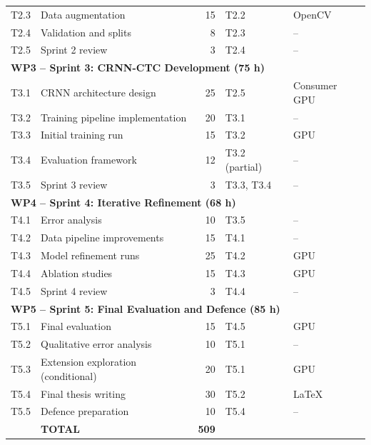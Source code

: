 \documentclass[11pt, a4paper]{article}
\begin{document}
\begin{table}[h!]
\begin{tabularx}{\linewidth}{c >{\raggedright}p{4.2cm} r >{\raggedright\arraybackslash}p{2.2cm} >{\raggedright\arraybackslash}p{2.0cm}}
        T2.3 & Data augmentation                    & 15  & T2.2           & OpenCV \\
        T2.4 & Validation and splits                & 8   & T2.3           & -- \\
        T2.5 & Sprint 2 review                      & 3   & T2.4           & -- \\
        \midrule
        \multicolumn{5}{l}{\textbf{WP3 -- Sprint 3: CRNN-CTC Development (75 h)}} \\
        \midrule
        T3.1 & CRNN architecture design             & 25  & T2.5           & Consumer GPU \\
        T3.2 & Training pipeline implementation      & 20  & T3.1           & -- \\
        T3.3 & Initial training run                 & 15  & T3.2           & GPU \\
        T3.4 & Evaluation framework                 & 12  & T3.2 (partial) & -- \\
        T3.5 & Sprint 3 review                      & 3   & T3.3, T3.4     & -- \\
        \midrule
        \multicolumn{5}{l}{\textbf{WP4 -- Sprint 4: Iterative Refinement (68 h)}} \\
        \midrule
        T4.1 & Error analysis                       & 10  & T3.5           & -- \\
        T4.2 & Data pipeline improvements           & 15  & T4.1           & -- \\
        T4.3 & Model refinement runs                & 25  & T4.2           & GPU \\
        T4.4 & Ablation studies                     & 15  & T4.3           & GPU \\
        T4.5 & Sprint 4 review                      & 3   & T4.4           & -- \\
        \midrule
        \multicolumn{5}{l}{\textbf{WP5 -- Sprint 5: Final Evaluation and Defence (85 h)}} \\
        \midrule
        T5.1 & Final evaluation                     & 15  & T4.5           & GPU \\
        T5.2 & Qualitative error analysis           & 10  & T5.1           & -- \\
        T5.3 & Extension exploration (conditional)  & 20  & T5.1           & GPU \\
        T5.4 & Final thesis writing                 & 30  & T5.2           & LaTeX \\
        T5.5 & Defence preparation                  & 10  & T5.4           & -- \\
        \midrule
        & \textbf{TOTAL}                           & \textbf{509} & & \\
        \bottomrule
    \end{tabularx}
\end{table}
\end{document}
